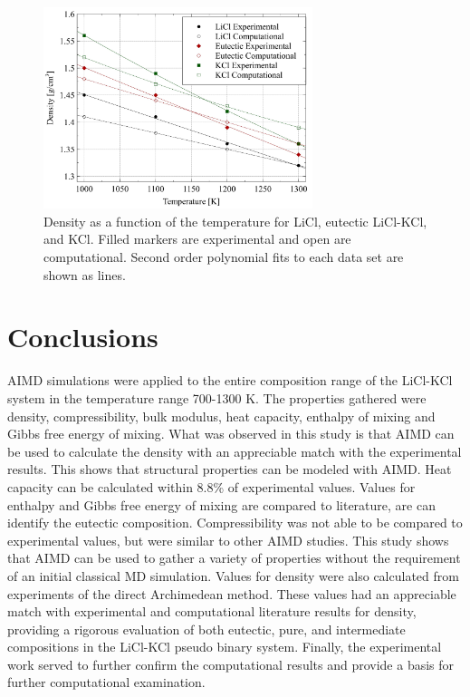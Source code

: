 \documentclass[review]{elsarticle}
\begin{document}
\begin{figure}[h]
 \centering
 \includegraphics[width=0.7\textwidth]{images/density_temp_comp.jpg} 
 \caption{Density as a function of the temperature for LiCl, eutectic LiCl-KCl, and KCl. Filled markers are experimental and open are computational. Second order polynomial fits to each data set are shown as lines. }
 \label{fig:densityCompTemp}
\end{figure} 
\FloatBarrier

\section{Conclusions}

AIMD simulations were applied to the entire composition range of the LiCl-KCl system in the temperature range 700-1300 K. The properties gathered were density, compressibility, bulk modulus, heat capacity, enthalpy of mixing and Gibbs free energy of mixing. What was observed in this study is that AIMD can be used to calculate the density with an appreciable match with the experimental results. This shows that structural properties can be modeled with AIMD. Heat capacity can be calculated within 8.8\% of experimental values. Values for enthalpy and Gibbs free energy of mixing are compared to literature, are can identify the eutectic composition. Compressibility was not able to be compared to experimental values, but were similar to other AIMD studies. This study shows that AIMD can be used to gather a variety of properties without the requirement of an initial classical MD simulation. Values for density were also calculated from experiments of the direct Archimedean method. These values had an appreciable match with experimental and computational literature results for density, providing a rigorous evaluation of both eutectic, pure, and intermediate compositions in the LiCl-KCl pseudo binary system. Finally, the experimental work served to further confirm the computational results and provide a basis for further computational examination.
\end{document}
